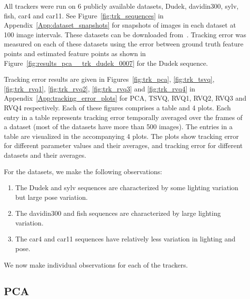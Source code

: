 All trackers were run on 6 publicly available datasets, Dudek, davidin300, sylv, fish, car4 and car11.  See Figure~\ref{fig:trk_sequences} in Appendix~\ref{App:dataset_snapshots} for snapshots of images in each dataset at 100 image intervals.  These datasets can be downloaded from~\cite{2008_JNL_subspaceTRK_Ross}.  Tracking error was measured on each of these datasets using the error between ground truth feature points and estimated feature points as shown in Figure~\ref{fig:results_pca__trk_dudek_0007} for the Dudek sequence.

Tracking error results are given in Figures~\ref{fig:trk_pca}, \ref{fig:trk_tsvq}, \ref{fig:trk_rvq1}, \ref{fig:trk_rvq2}, \ref{fig:trk_rvq3} and \ref{fig:trk_rvq4} in Appendix~\ref{App:tracking_error_plots} for PCA, TSVQ, RVQ1, RVQ2, RVQ3 and RVQ4 respectively.  Each of these figures comprises a table and 4 plots.  Each entry in a table represents tracking error temporally averaged over the frames of a dataset (most of the datasets have more than 500 images).  The entries in a table are visualized in the accompanying 4 plots.  The plots show tracking error for different parameter values and their averages, and tracking error for different datasets and their averages.  

For the datasets, we make the following observations:

\begin{enumerate}
\item The Dudek and sylv sequences are characterized by some lighting variation but large pose variation.
\item The davidin300 and fish sequences are characterized by large lighting variation.
\item The car4 and car11 sequences have relatively less variation in lighting and pose.
\end{enumerate}

We now make individual observations for each of the trackers.

\subsection{PCA}

